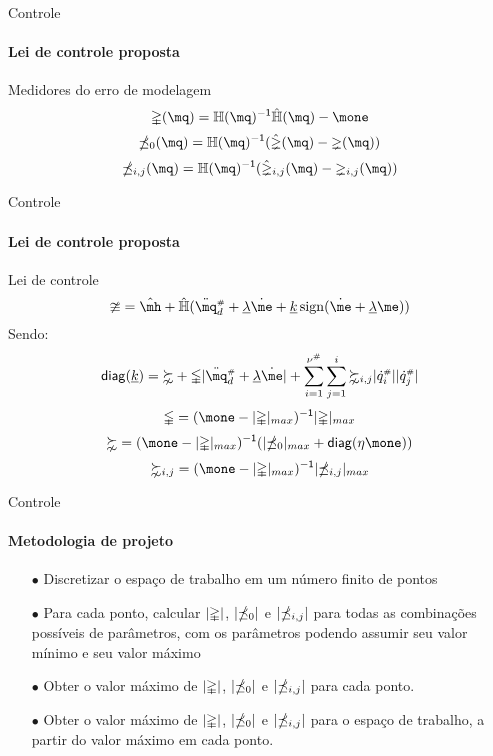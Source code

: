 \documentclass[25pt,landscape]{beamer}
\begin{document}
\begin{frame}{Controle}
    \framesubtitle{Lei de controle proposta}
   	\begin{block}{Medidores do erro de modelagem}
   		$$ \mDelta(\mq) = \mH(\mq)^\msI \hat{\mH}(\mq) - \mone $$
    	$$ \mdelta_0(\mq) = \mH(\mq)^\msI (\hat{\mgamma}(\mq) - \mgamma(\mq)) $$
    	$$ \mdelta_{i,j}(\mq) = \mH(\mq)^\msI (\hat{\mgamma}_{i,j}(\mq) - \mgamma_{i,j}(\mq)) $$
   	\end{block}
\end{frame}

\begin{frame}{Controle}
    \framesubtitle{Lei de controle proposta}
	\begin{block}{Lei de controle}
    	$$ \mup = \hat{\mh} + \hat{\mH}( \ddot{\mq}\ssh_d + \underline{\lambda}\dot{\me} + \underline{k} \sign(\dot{\me} + \underline{\lambda}\me) ) $$
    	\pause
    	Sendo:
    	$$ \diag(\underline{k})  = \meta + \mGamma |\ddot{\mq}\ssh_d + \underline{\lambda}\dot{\me}| + \sum_{i=1}^{\nu\ssh}\sum_{j=1}^{i} \meta_{i,j} |\dot{q}\ssh_i||\dot{q}\ssh_j| $$
    	$$ \mGamma = (\mone - |\mDelta|_{max} )^\msI |\mDelta|_{max} $$
    	$$ \meta = (\mone - |\mDelta|_{max} )^\msI ( | \mdelta_0 |_{max} + \diag(\eta \mone) ) $$
    	$$ \meta_{i,j} = (\mone - |\mDelta|_{max} )^\msI | \mdelta_{i,j} |_{max} $$
   	\end{block}
\end{frame}

\begin{frame}{Controle}
    \framesubtitle{Metodologia de projeto}
    \begin{block}{}
    	\begin{itemize}
    		\pause
			\item[$\bullet$] Discretizar o espa\c{c}o de trabalho em um n\'umero finito de pontos \\[8pt]
			\pause
			\item[$\bullet$] Para cada ponto, calcular $|\mathbb{\Delta}|$, $|\mathbb{\delta}_0|$ e $|\mathbb{\delta}_{i,j}|$ para todas as combina\c{c}\~oes poss\'iveis de par\^ametros, com os par\^ametros podendo assumir seu valor m\'inimo e seu valor m\'aximo \\[8pt]
			\pause
			\item[$\bullet$] Obter o valor m\'aximo de $|\mathbb{\Delta}|$, $|\mathbb{\delta}_0|$ e $|\mathbb{\delta}_{i,j}|$ para cada ponto. \\[8pt]
			\pause
			\item[$\bullet$] Obter o valor m\'aximo de $|\mathbb{\Delta}|$, $|\mathbb{\delta}_0|$ e $|\mathbb{\delta}_{i,j}|$ para o espa\c{c}o de trabalho, a partir do valor m\'aximo em cada ponto. \\[8pt]
		\end{itemize}
	\end{block}
\end{frame}
\end{document}
